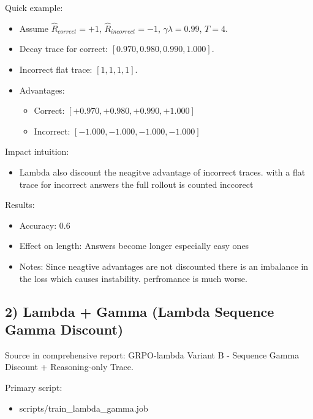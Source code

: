 \documentclass[
]{article}
\providecommand{\tightlist}{%
  \setlength{\itemsep}{0pt}\setlength{\parskip}{0pt}}
\begin{document}
Quick example:

\begin{itemize}
\item
  Assume \(\hat{R}_{correct}=+1\), \(\hat{R}_{incorrect}=-1\),
  \(\gamma\lambda=0.99\), \(T=4\).
\item
  Decay trace for correct: \([0.970, 0.980, 0.990, 1.000]\).
\item
  Incorrect flat trace: \([1,1,1,1]\).
\item
  Advantages:

  \begin{itemize}
  \tightlist
  \item
    Correct: \([+0.970,+0.980,+0.990,+1.000]\)
  \item
    Incorrect: \([-1.000,-1.000,-1.000,-1.000]\)
  \end{itemize}
\end{itemize}

Impact intuition:

\begin{itemize}
\tightlist
\item
  Lambda also discount the neagitve advantage of incorrect traces. with
  a flat trace for incorrect answers the full rollout is counted
  inccorect
\end{itemize}

Results:

\begin{itemize}
\tightlist
\item
  Accuracy: 0.6
\item
  Effect on length: Answers become longer especially easy ones
\item
  Notes: Since neagtive advantages are not discounted there is an
  imbalance in the loss which causes instability. perfromance is much
  worse.
\end{itemize}

\subsection{2) Lambda + Gamma (Lambda Sequence Gamma
Discount)}\label{lambda-gamma-lambda-sequence-gamma-discount}

Source in comprehensive report: GRPO-lambda Variant B - Sequence Gamma
Discount + Reasoning-only Trace.

Primary script:

\begin{itemize}
\tightlist
\item
  scripts/train\_lambda\_gamma.job
\end{itemize}
\end{document}
